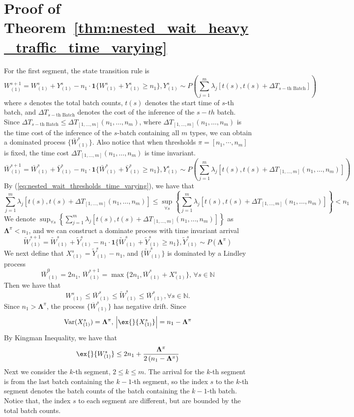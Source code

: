 \documentclass[preprint]{article}
\theoremstyle{plain}
\theoremstyle{definition}
\theoremstyle{remark}
\begin{document}
\section{Proof of Theorem~\ref{thm:nested_wait_heavy_traffic_time_varying}}\label{appendix:: proof of nested optimality, time varying.}
For the first segment, the state transition rule is 
$$ W_{(1)}^{s+1} = W_{(1)}^{s} + Y_{(1)}^s  - n_1 \cdot \mathbf{1}\{ W_{(1)}^{s} + Y_{(1)}^s \geq n_1 \},  Y_{(1)}^s \sim P( \sum_{j=1}^m \lambda_j[t(s), t(s)+ \Delta T_{s-\text{th Batch}}] )  $$
where $s$ denotes the total batch counts, $t(s)$ denotes the start time of $s$-th batch, and $\Delta T_{s-\text{th Batch}}$ denotes the cost of the inference of the $s-th$ batch. Since $\Delta T_{s-\text{th Batch}}\leq \Delta T_{[1,\dots,m]}(n_1,\dots,n_m)$, where $\Delta T_{[1,\dots,m]}(n_1,\dots,n_m)$ is the time cost of the inference of the $s$-batch containing all $m$ types, we can obtain a dominated process $\{\bar{W}_{(1)}^{s}\}$. Also notice that when thresholds $\pi = [n_1, \cdots,n_m]$ is fixed, the time cost $\Delta T_{[1,\dots,m]}(n_1,\dots,n_m)$ is time invariant.
$$ \bar{W}_{(1)}^{s+1} = \bar{W}_{(1)}^{s} + \bar{Y}_{(1)}^s  - n_1 \cdot \mathbf{1}\{ \bar{W}_{(1)}^{s} + \bar{Y}_{(1)}^s \geq n_1 \},  Y_{(1)}^s \sim P(  \sum_{j=1}^m \lambda_j[t(s), t(s)+\Delta T_{[1,\dots,m]}(n_1,\dots,n_m)] )  $$
By (\ref{eq:nested_wait_thresholds_time_varying}), we have that
$$ \sum_{j=1}^m \lambda_j[t(s), t(s)+\Delta T_{[1,\dots,m]}(n_1,\dots,n_m)] \leq \sup_{\forall s}\left\{\sum_{j=1}^m \lambda_j[t(s), t(s)+\Delta T_{[1,\dots,m]}(n_1,\dots,n_m)] \right\} < n_1$$
We denote $\sup_{\forall s}\left\{\sum_{j=1}^m \lambda_j[t(s), t(s)+\Delta T_{[1,\dots,m]}(n_1,\dots,n_m)] \right\}$ as $\mathbf{\Lambda}^{\pi}<n_1$, and we can construct a dominate process with time invariant arrival
$$ \tilde{W}_{(1)}^{s+1} = \tilde{W}_{(1)}^{s} + \tilde{Y}_{(1)}^s  - n_1 \cdot \mathbf{1}\{ \tilde{W}_{(1)}^{s} + \tilde{Y}_{(1)}^s \geq n_1 \},  \tilde{Y}_{(1)}^s \sim P(\mathbf{\Lambda}^{\pi})  $$
We next define that $X_{(1)}^s = \tilde{Y}_{(1)}^s - n_1  $, and $\{ \tilde{W}_{(1)}^{s}\}$ is dominated by a Lindley process
$$ \overline{W}_{(1)}^{0} = 2n_1,\,  \overline{W}_{(1)}^{s+1} = \max \{  2n_1, \overline{W}_{(1)}^{s} + X_{(1)}^s \},\,\forall s \in \mathbb{N} $$
Then we have that
$$ W_{(1)}^{s}\leq \bar{W}_{(1)}^{s} \leq \tilde{W}_{(1)}^{s} \leq \overline{W}_{(1)}^{s}, \forall s \in \mathbb{N}.$$
Since $n_1> \mathbf{\Lambda}^{\pi}$, the process $\{\overline{W}_{(1)}^{s} \}$ has negative drift. Since 
$$\text{Var}(X_{(1)}^s ) = \mathbf{\Lambda}^{\pi},\,\left|  \ex{}{X_{(1)}^s} \right| = n_1 - \mathbf{\Lambda}^{\pi}$$
By Kingman Inequality, we have that
$$  \ex{}{W_{(1)}^s}\leq  2n_1 + \frac{\mathbf{\Lambda}^{\pi}}{2\left(n_1 -\mathbf{\Lambda}^{\pi}\right)} $$
Next we consider the $k$-th segment, $2\leq k\leq m$. The arrival for the $k$-th segment is from the last batch containing the $k-1$-th segment, so the index $s$ to the $k$-th segment denotes the batch counts of the batch containing the $k-1$-th batch. Notice that, the index $s$ to each segment are different, but are bounded by the total batch counts. 
\end{document}
